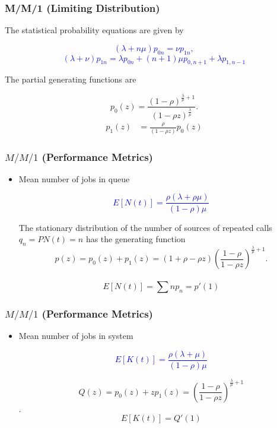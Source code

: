 \documentclass{beamer}
\def \mp {\pause}
\def \mp {}
\newcommand{\ft}[1]{\frametitle{#1}}
\newcommand{\tcb}[1]{\textcolor{blue}{#1}}
\begin{document}
\begin{frame}
\ft{M/M/1 (Limiting Distribution)} 
The statistical probability equations are given by
\mp
\begin{tcolorbox}
\tcb{\[(\lambda+n\mu)p_{0n}=\nu p_{1n},\]
  \[(\lambda+\nu)p_{1n}=\lambda p_{0n}+(n+1)\mu p_{0,n+1}+\lambda p_{1,n-1} \]} 
\end{tcolorbox}
\mp 
The partial generating functions are
\begin{tcolorbox}
    \[p_{0}(z)=\frac{(1-\rho)^{\frac{\lambda}{\mu}+1}}{(1-\rho z)^{\frac{\lambda}{\mu}}}.\]    
    \begin{align*}
    p_{1}(z)&=\frac{\rho}{(1-\rho z)}p_0(z)
  \end{align*}
    \end{tcolorbox}
\end{frame}


\begin{frame}
 \ft{$M/M/1$ (Performance Metrics)}

\begin{itemize}\setlength\itemsep{.6em}
 \mp \item Mean number of jobs in queue
 \mp
\begin{tcolorbox}
\tcb{\[E[N(t)] = \frac{\rho(\lambda + \rho\mu)}{(1-\rho)\mu}\]} 
\end{tcolorbox}
The stationary distribution of the number of sources of repeated calls  $q_{n}=P{N(t)=n}$ has the generating function
\[p(z)=p_{0}(z)+p_{1}(z)=(1+\rho-\rho z)(\frac{1-\rho}{1-\rho z})^{\frac{\lambda}{\mu}+1}.\] \\ 
\[E[N(t)]=\sum np_n= p'(1)\]
\end{itemize}
\end{frame}

\begin{frame}
 \ft{$M/M/1$ (Performance Metrics)}

\begin{itemize}\setlength\itemsep{.6em}
 \mp \item Mean number of jobs in system
 \mp
\begin{tcolorbox}
\tcb{\[E[K(t)] = \frac{\rho(\lambda + \mu)}{(1-\rho)\mu}\]} 
\end{tcolorbox}
$$Q(z)=p_{0}(z)+zp_{1}(z)=(\frac{1-\rho}{1-\rho z})^{\frac{\lambda}{\mu}+1}$$.
$$E[K(t)]=Q'(1)$$
\end{itemize}
\end{frame}
\end{document}
